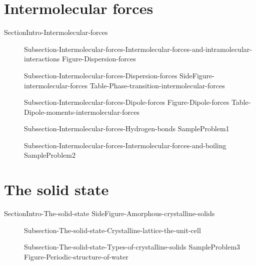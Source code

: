 \documentclass[main.tex]{subfiles}
\newcommand\chapterlabel{Ch-solids}\setcounter{figurenewcounter}{0}\setcounter{tablenewcounter}{0}\setcounter{formulanewcounter}{0}\chapterpicture{../{\chapterlabel}/figure1}\chapterpicturelabel{PxFuel}
\begin{document}
\section{Intermolecular forces}{SectionIntro-Intermolecular-forces}
\sloppy \begin{description}
\item[] {Subsection-Intermolecular-forces-Intermolecular-forces-and-intramolecular-interactions}
{Figure-Dispersion-forces}
\item[] {Subsection-Intermolecular-forces-Dispersion-forces}
{SideFigure-intermolecular-forces}
{Table-Phase-transition-intermolecular-forces}
\item[] {Subsection-Intermolecular-forces-Dipole-forces}
{Figure-Dipole-forces}
{Table-Dipole-moments-intermolecular-forces}
\item[] {Subsection-Intermolecular-forces-Hydrogen-bonds}
{SampleProblem1}
\item[] {Subsection-Intermolecular-forces-Intermolecular-forces-and-boiling}
{SampleProblem2}
\end{description}

\section{The solid state}{SectionIntro-The-solid-state}
{SideFigure-Amorphous-crystalline-solids}
\vspace{2cm}{Figure-Chrystalline-solid-unit-cell}
\sloppy \begin{description}
\item[] {Subsection-The-solid-state-Crystalline-lattice-the-unit-cell}
\item[] {Subsection-The-solid-state-Types-of-crystalline-solids}
{SampleProblem3}
{Figure-Periodic-structure-of-water}
\end{description}
\end{document}
